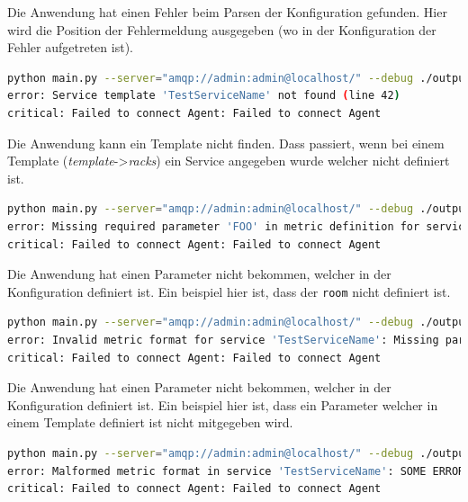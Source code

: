 \noindent
Die Anwendung hat einen Fehler beim Parsen der Konfiguration gefunden.
Hier wird die Position der Fehlermeldung ausgegeben (wo in der Konfiguration der Fehler aufgetreten ist).

\begin{lstlisting}[language=bash, caption=Template nicht gefunden, label=lst:error-template]
python main.py --server="amqp://admin:admin@localhost/" --debug ./output
error: Service template 'TestServiceName' not found (line 42)
critical: Failed to connect Agent: Failed to connect Agent
\end{lstlisting}

\noindent
Die Anwendung kann ein Template nicht finden.
Dass passiert, wenn bei einem Template (\textit{template}->\textit{racks}) ein Service angegeben wurde welcher nicht definiert ist.

\begin{lstlisting}[language=bash, caption=Standard Parameter nicht gefunden, label=lst:error-metric]
python main.py --server="amqp://admin:admin@localhost/" --debug ./output
error: Missing required parameter 'FOO' in metric definition for service 'TestServiceName' (line 42)
critical: Failed to connect Agent: Failed to connect Agent
\end{lstlisting}

\noindent
Die Anwendung hat einen Parameter nicht bekommen, welcher in der Konfiguration definiert ist.
Ein beispiel hier ist, dass der \texttt{room} nicht definiert ist.

\begin{lstlisting}[language=bash, caption=Parameter nicht gefunden, label=lst:error-metric2]
python main.py --server="amqp://admin:admin@localhost/" --debug ./output
error: Invalid metric format for service 'TestServiceName': Missing parameter name inside curly braces (line 42)
critical: Failed to connect Agent: Failed to connect Agent
\end{lstlisting}

\noindent
Die Anwendung hat einen Parameter nicht bekommen, welcher in der Konfiguration definiert ist.
Ein beispiel hier ist, dass ein Parameter welcher in einem Template definiert ist nicht mitgegeben wird.

\begin{lstlisting}[language=bash, caption=Formatfehler, label=lst:error-metric3]
python main.py --server="amqp://admin:admin@localhost/" --debug ./output
error: Malformed metric format in service 'TestServiceName': SOME ERROR MESSAGE (line 42)
critical: Failed to connect Agent: Failed to connect Agent
\end{lstlisting}

